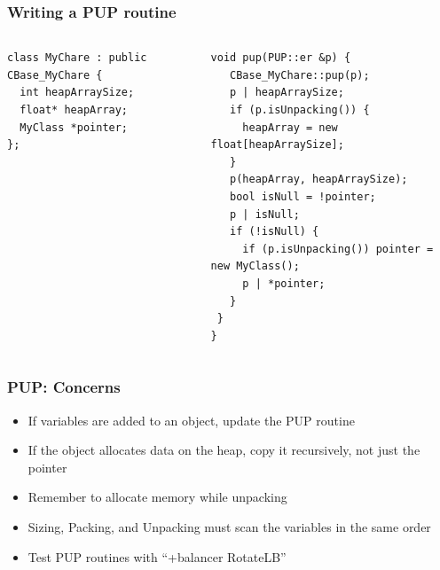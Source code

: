 \begin{frame}[fragile]
\frametitle{Writing a PUP routine}
 \begin{columns}
 \begin{column}{0.5\textwidth}
   \begin{lstlisting}
class MyChare : public CBase_MyChare {
  int heapArraySize;
  float* heapArray;
  MyClass *pointer;
};
 \end{lstlisting}
 \end{column}
 \begin{column}{0.5\textwidth}
  \begin{lstlisting}
void pup(PUP::er &p) {
   CBase_MyChare::pup(p);
   p | heapArraySize;
   if (p.isUnpacking()) {
     heapArray = new float[heapArraySize];
   }
   p(heapArray, heapArraySize);
   bool isNull = !pointer;
   p | isNull;
   if (!isNull) {
     if (p.isUnpacking()) pointer = new MyClass();
     p | *pointer;
   }
 }
}
  \end{lstlisting}
  \end{column}
  \end{columns}
\end{frame}


\begin{frame}[fragile]
\frametitle{PUP: Concerns}
\begin{itemize}
\item If variables are added to an object, update the PUP routine
\item If the object allocates data on the heap, copy it recursively, not just the pointer
\item Remember to allocate memory while unpacking
\item Sizing, Packing, and Unpacking must scan the variables in the same order
\item Test PUP routines with “+balancer RotateLB”
\end{itemize}
\end{frame}



